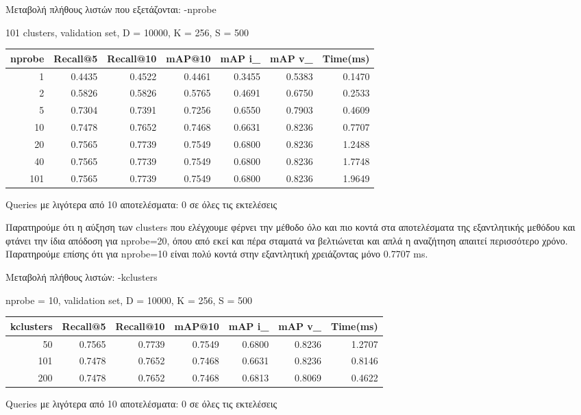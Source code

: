 \documentclass [conference]{IEEEtran}
\begin{document}
Μεταβολή πλήθους λιστών που εξετάζονται: -nprobe
\begin{table}[H]
    \centering
    \footnotesize
    \setlength{\tabcolsep}{3pt}
    101 clusters, validation set, D = 10000, K = 256, S = 500
    \par\smallskip
    \begin{tabular}{r r r r r r r}
    \hline
    \textbf{nprobe} & \textbf{Recall@5} & \textbf{Recall@10} & \textbf{mAP@10} & \textbf{mAP i\_} & \textbf{mAP v\_} & \textbf{Time(ms)} \\
    \hline
    1   & 0.4435 & 0.4522 & 0.4461 & 0.3455 & 0.5383 & 0.1470 \\
    2   & 0.5826 & 0.5826 & 0.5765 & 0.4691 & 0.6750 & 0.2533 \\
    5   & 0.7304 & 0.7391 & 0.7256 & 0.6550 & 0.7903 & 0.4609 \\
    10  & 0.7478 & 0.7652 & 0.7468 & 0.6631 & 0.8236 & 0.7707 \\
    20  & 0.7565 & 0.7739 & 0.7549 & 0.6800 & 0.8236 & 1.2488 \\
    40  & 0.7565 & 0.7739 & 0.7549 & 0.6800 & 0.8236 & 1.7748 \\
    101 & 0.7565 & 0.7739 & 0.7549 & 0.6800 & 0.8236 & 1.9649 \\
    \hline
    \end{tabular}
    \par\smallskip
    \footnotesize Queries με λιγότερα από 10 αποτελέσματα: 0 σε όλες τις εκτελέσεις
    \end{table}

Παρατηρούμε ότι η αύξηση των clusters που ελέγχουμε φέρνει την μέθοδο όλο και πιο κοντά στα αποτελέσματα της εξαντλητικής μεθόδου και φτάνει την ίδια απόδοση για nprobe=20, όπου από εκεί και πέρα σταματά να βελτιώνεται και απλά η αναζήτηση απαιτεί περισσότερο χρόνο. Παρατηρούμε επίσης ότι για nprobe=10 είναι πολύ κοντά στην εξαντλητική χρειάζοντας μόνο 0.7707 ms.

Μεταβολή πλήθους λιστών: -kclusters
\begin{table}[H]
    \centering
    \footnotesize
    \setlength{\tabcolsep}{3pt}
    nprobe = 10, validation set, D = 10000, K = 256, S = 500
    \par\smallskip
    \begin{tabular}{r r r r r r r}
    \hline
    \textbf{kclusters} & \textbf{Recall@5} & \textbf{Recall@10} & \textbf{mAP@10} & \textbf{mAP i\_} & \textbf{mAP v\_} & \textbf{Time(ms)} \\
    \hline
    50  & 0.7565 & 0.7739 & 0.7549 & 0.6800 & 0.8236 & 1.2707 \\
    101 & 0.7478 & 0.7652 & 0.7468 & 0.6631 & 0.8236 & 0.8146 \\
    200 & 0.7478 & 0.7652 & 0.7468 & 0.6813 & 0.8069 & 0.4622 \\
    \hline
    \end{tabular}
    \par\smallskip
    \footnotesize Queries με λιγότερα από 10 αποτελέσματα: 0 σε όλες τις εκτελέσεις
    \end{table}
\end{document}
